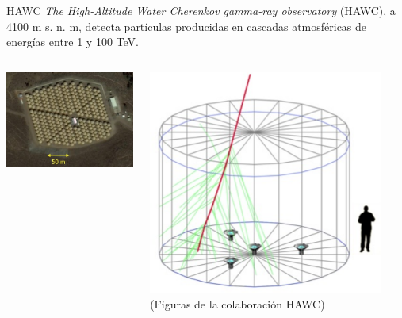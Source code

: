 \documentclass[10pt,xcolor=table]{beamer}
\begin{document}
\begin{frame}{HAWC}
\textit{The High-Altitude Water Cherenkov gamma-ray observatory} (HAWC), a 4100 m s. n. m, detecta part\'iculas producidas en cascadas atmosf\'ericas de energ\'ias entre 1 y 100 TeV. \vspace{0.3cm}
	\begin{columns}
		\begin{column}{0.7\textwidth}
		\center
		\href{run:Figuras/HAWC.mov?autostart&loop&start=2&stop=120}
       {\includegraphics[width=1\textwidth]{Figuras/hawc-array}}
		\end{column}
		
		\begin{column}{0.3\textwidth}
		\center
		\includegraphics[width=0.9\textwidth]{Figuras/hawc-tank}
		(Figuras de la colaboraci\'on HAWC)
		\end{column}
	\end{columns}

\end{frame}
	
\end{document}
